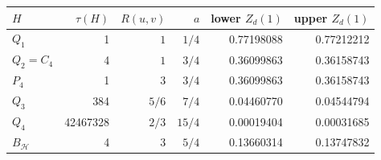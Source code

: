\begin{tabular}{lrrrrr}
\toprule
$H$ & $\tau(H)$ & $R(u,v)$ & $a$ & lower $Z_d(1)$ & upper $Z_d(1)$\\
\midrule
$Q_1$ & 1 & $1$ & $1/4$ & 0.77198088 & 0.77212212\\
$Q_2=C_4$ & 4 & $1$ & $3/4$ & 0.36099863 & 0.36158743\\
$P_4$ & 1 & $3$ & $3/4$ & 0.36099863 & 0.36158743\\
$Q_3$ & 384 & $5/6$ & $7/4$ & 0.04460770 & 0.04544794\\
$Q_4$ & 42467328 & $2/3$ & $15/4$ & 0.00019404 & 0.00031685\\
$B_{\mathcal H}$ & 4 & $3$ & $5/4$ & 0.13660314 & 0.13747832\\
\bottomrule
\end{tabular}
